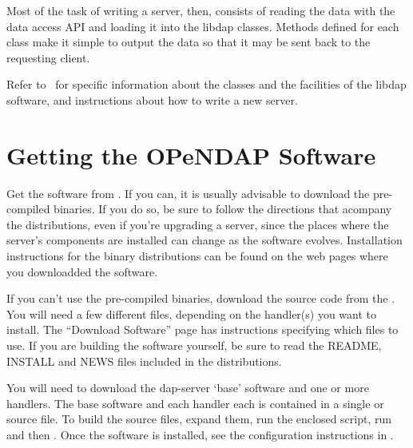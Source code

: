 \documentclass{dods-book}
\begin{document}
Most of the task of writing a server, then, consists of reading the
data with the data access API and loading it into the libdap classes.
Methods defined for each class make it simple to output the data so
that it may be sent back to the requesting client.

Refer to \DODSapi\ for specific information about the classes and the
facilities of the libdap software, and instructions about how to write
a new server.



\appendix
\chapter{Getting the OPeNDAP Software}
\label{install}

Get the software from \DODShome .  If you can, it is usually advisable
to download the pre-compiled binaries.  If you do so, be sure to
follow the directions that acompany the distributions, even if you're
upgrading a server, since the places where the server's components are
installed can change as the software evolves. Installation
instructions for the binary distributions can be found on the web
pages where you downloadded the software.

If you can't use the pre-compiled binaries, download the source code
from the \DODShome . You will need a few different files, depending on
the handler(s) you want to install. The ``Download Software'' page has
instructions specifying which files to use. If you are building the
software yourself, be sure to read the README, INSTALL and NEWS files
included in the distributions.

You will need to download the dap-server `base' software and one or
more handlers. The base software and each handler each is contained in
a single  or source  file. To build the source
files, expand them, run the enclosed  script, run
 and then . Once the software is
installed, see the configuration instructions
in . 



\printindex
\end{document}
